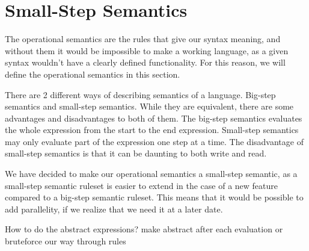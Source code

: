 \section{Small-Step Semantics}
The operational semantics are the rules that give our syntax meaning, and without them it would be impossible to make a working language, as a given syntax wouldn't have a clearly defined functionality. For this reason, we will define the operational semantics in this section.

There are 2 different ways of describing semantics of a language. Big-step semantics and small-step semantics. While they are equivalent, there are some advantages and disadvantages to both of them. The big-step semantics evaluates the whole expression from the start to the end expression. Small-step semantics may only evaluate part of the expression one step at a time. The disadvantage of small-step semantics is that it can be daunting to both write and read.

We have decided to make our operational semantics a small-step semantic, as a small-step semantic ruleset is easier to extend in the case of a new feature compared to a big-step semantic ruleset. This means that it would be possible to add parallelity, if we realize that we need it at a later date.


How to do the abstract expressions? make abstract after each evaluation or bruteforce our way through rules

